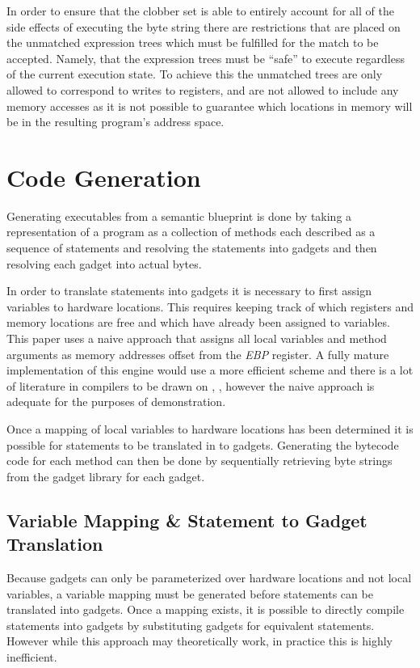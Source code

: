     In order to ensure that the clobber set is able to entirely account for all
    of the side effects of executing the byte string there are restrictions that
    are placed on the unmatched expression trees which must be fulfilled for the
    match to be accepted. Namely, that the expression trees must be ``safe'' to
    execute regardless of the current execution state. To achieve this the
    unmatched trees are only allowed to correspond to writes to registers, and
    are not allowed to include any memory accesses as it is not possible to
    guarantee which locations in memory will be in the resulting program's
    address space.

    \section{Code Generation}

    Generating executables from a semantic blueprint is done by taking a
    representation of a program as a collection of methods each described as a
    sequence of statements and resolving the statements into gadgets and then
    resolving each gadget into actual bytes.

    In order to translate statements into gadgets it is necessary to first
    assign variables to hardware locations. This requires keeping track of which
    registers and memory locations are free and which have already been assigned
    to variables. This paper uses a naive approach that assigns all local
    variables and method arguments as memory addresses offset from the
    \emph{EBP} register. A fully mature implementation of this engine would use
    a more efficient scheme and there is a lot of literature in compilers to be
    drawn on \cite{register-coloring}, \cite{register-iterate}, however the
    naive approach is adequate for the purposes of demonstration.

    Once a mapping of local variables to hardware locations has been determined
    it is possible for statements to be translated in to gadgets. Generating the
    bytecode code for each method can then be done by sequentially retrieving
    byte strings from the gadget library for each gadget. 

    \subsection{Variable Mapping \& Statement to Gadget Translation}

    Because gadgets can only be parameterized over hardware locations and not
    local variables, a variable mapping must be generated before statements can
    be translated into gadgets. Once a mapping exists, it is possible to
    directly compile statements into gadgets by substituting gadgets for
    equivalent statements. However while this approach may theoretically work,
    in practice this is highly inefficient.
    
